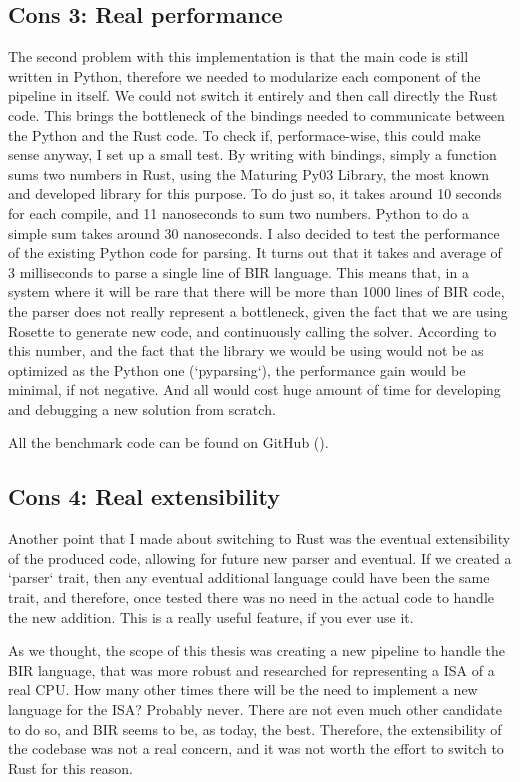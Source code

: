 \subsection[Real performance]{Cons 3: Real performance}
The second problem with this implementation is that the main code is still
written in Python, therefore we needed to modularize each component of the pipeline
in itself. We could not switch it entirely and then call directly the Rust code.
This brings the bottleneck of the bindings needed to communicate between the Python
and the Rust code. To check if, performace-wise, this could make sense anyway, I
set up a small test. By writing with bindings, simply a function sums two numbers
in Rust, using the Maturing Py03 Library, the most known and developed library for
this purpose. To do just so, it takes around 10 seconds for each compile, and 11
nanoseconds to sum two numbers. Python to do a simple sum takes around 30 nanoseconds.
I also decided to test the performance of the existing Python code for parsing. It
turns out that it takes and average of 3 milliseconds to parse a single line of BIR
language. This means that, in a system where it will be rare that there will be more
than 1000 lines of BIR code, the parser does not really represent a bottleneck, given
the fact that we are using Rosette to generate new code, and continuously
calling the solver. According to this number, and the fact that the library we
would be using would not be as optimized as the Python one (`pyparsing`), the performance
gain would be minimal, if not negative. And all would cost huge amount of time for
developing and debugging a new solution from scratch.

All the benchmark code can be found on GitHub (\cite{benchmark}).

\subsection[Real extensibility]{Cons 4: Real extensibility}
Another point that I made about switching to Rust was the eventual extensibility
of the produced code, allowing for future new parser and eventual. If we created
a `parser` trait, then any eventual additional language could have been the same
trait, and therefore, once tested there was no need in the actual code to handle
the new addition. This is a really useful feature, if you ever use it.

As we thought, the scope of this thesis was creating a new pipeline to handle the
BIR language, that was more robust and researched for representing a ISA of a
real CPU. How many other times there will be the need to implement a new language
for the ISA? Probably never. There are not even much other candidate to do so,
and BIR seems to be, as today, the best. Therefore, the extensibility of the
codebase was not a real concern, and it was not worth the effort to switch to Rust
for this reason.


